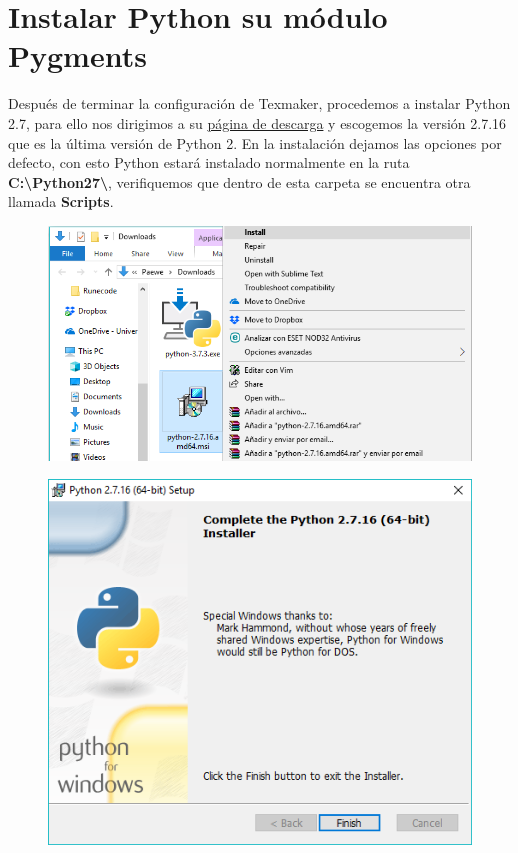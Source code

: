 \documentclass{article}
\begin{document}
\section{Instalar Python su módulo Pygments}%
Después de terminar la configuración de Texmaker, procedemos a instalar
Python 2.7, para ello nos dirigimos a su
\href{https://www.python.org/downloads/windows/}{página de descarga} y
escogemos la versión 2.7.16 que es la última versión de Python 2. En la
instalación dejamos las opciones por defecto, con esto Python estará instalado
normalmente en la ruta \textbf{C:{\textbackslash}Python27{\textbackslash}},
verifiquemos que dentro de esta carpeta se encuentra otra llamada \textbf{Scripts}.

\begin{figure}[h!]
  \centering
  \includegraphics[scale=0.75]{./imagenes/python27_install.png}
\end{figure}

\begin{figure}[h!]
  \centering
  \includegraphics[scale=0.75]{./imagenes/python27_install2.png}
\end{figure}
\end{document}
